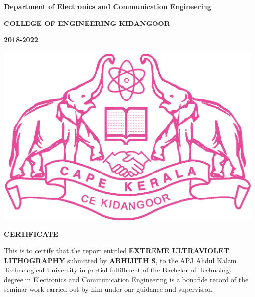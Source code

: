\documentclass[12pt,a4paper]{report}
\begin{document}
\newpage
\begin{center}


\textbf{Department of Electronics and Communication Engineering}

\textbf{COLLEGE OF ENGINEERING KIDANGOOR}


\textbf{2018-2022}
\end{center}
\begin{center}
\includegraphics[scale=0.25]{ceklogo.jpg}

\end{center}
\vspace{0.2cm}
\begin{center}
 \textbf{CERTIFICATE}
\end{center}
This is to certify that the report entitled \textbf{ \large EXTREME ULTRAVIOLET LITHOGRAPHY} 
submitted by \textbf{ABHIJITH S}, to the APJ Abdul Kalam Technological University in 
partial fulfillment of the Bachelor of Technology degree in Electronics 
and Communication Engineering is a bonafide record of the seminar work 
carried out by him under our guidance and supervision.
\vspace{3cm}
\end{document}
